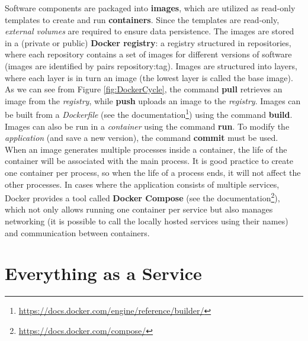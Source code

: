 Software components are packaged into \textbf{images}, which are utilized as read-only templates to create and run \textbf{containers}. Since the templates are read-only, \emph{external volumes} are required to ensure data persistence. The images are stored in a (private or public) \textbf{Docker registry}: a registry structured in repositories, where each repository contains a set of images for different versions of software (images are identified by pairs repository:tag). Images are structured into layers, where each layer is in turn an image (the lowest layer is called the base image). \\

As we can see from Figure \ref{fig:DockerCycle}, the command \textbf{pull} retrieves an image from the \emph{registry}, while \textbf{push} uploads an image to the \emph{registry}. Images can be built from a \emph{Dockerfile} (see the documentation\footnote{\url{https://docs.docker.com/engine/reference/builder/}}) using the command \textbf{build}. Images can also be run in a \emph{container} using the command \textbf{run}. To modify the \emph{application} (and save a new version), the command \textbf{commit} must be used. \\

When an image generates multiple processes inside a container, the life of the container will be associated with the main process. It is good practice to create one container per process, so when the life of a process ends, it will not affect the other processes. In cases where the application consists of multiple services, Docker provides a tool called \textbf{Docker Compose} (see the documentation\footnote{\url{https://docs.docker.com/compose/}}), which not only allows running one container per service but also manages networking (it is possible to call the locally hosted services using their names) and communication between containers.

\section{Everything as a Service}

